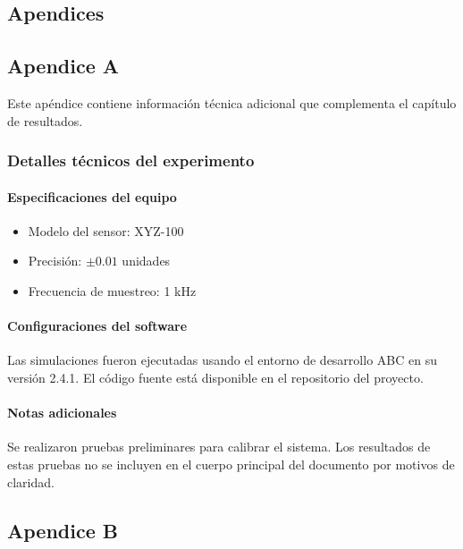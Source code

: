 \begin{appendices}


 \chapter{Apendices}
 \section{Apendice A}
 \label{sec:Apendice A}
 Este apéndice contiene información técnica adicional que complementa el capítulo de resultados.
 
 \subsection{Detalles técnicos del experimento}
 \subsubsection{Especificaciones del equipo}
 
 \begin{itemize}
   \item Modelo del sensor: XYZ-100
   \item Precisión: $\pm 0.01$ unidades
   \item Frecuencia de muestreo: 1 kHz
 \end{itemize}
 
 \subsubsection{Configuraciones del software}
 
 Las simulaciones fueron ejecutadas usando el entorno de desarrollo ABC en su versión 2.4.1.  
 El código fuente está disponible en el repositorio del proyecto.
 
 \subsubsection{Notas adicionales}
 
 Se realizaron pruebas preliminares para calibrar el sistema. Los resultados de estas pruebas no se incluyen en el cuerpo principal del documento por motivos de claridad.


\section{Apendice B}
 
\end{appendices}



